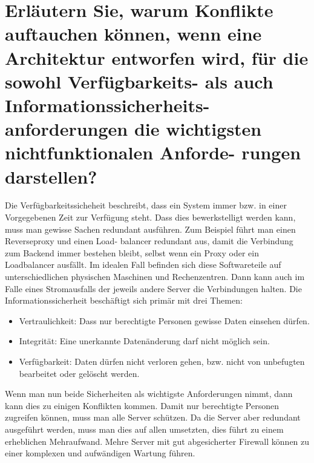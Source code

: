 \documentclass[12pt]{article}
\begin{document}
\section{Erläutern Sie, warum Konflikte auftauchen können, wenn eine Architektur entworfen wird, für die sowohl
Verfügbarkeits- als auch Informationssicherheits- anforderungen die wichtigsten nichtfunktionalen Anforde-
rungen darstellen?}
Die Verfügbarkeitssicheheit beschreibt, dass ein System immer bzw. in einer Vorgegebenen Zeit zur Verfügung steht. Dass dies bewerkstelligt werden kann, muss man gewisse Sachen redundant ausführen. Zum Beispiel führt man einen Reverseproxy und einen Load- balancer redundant aus, damit die Verbindung zum Backend immer bestehen bleibt, selbst wenn ein Proxy oder ein Loadbalancer ausfällt. Im idealen Fall befinden sich diese Softwareteile auf unterschiedlichen physischen Maschinen und Rechenzentren. Dann kann auch im Falle eines Stromausfalls der jeweils andere Server die Verbindungen halten. Die Informationssicherheit beschäftigt sich primär mit drei Themen:
\begin{itemize}
 \item Vertraulichkeit: Dass nur berechtigte Personen gewisse Daten einsehen dürfen.
 \item Integrität: Eine unerkannte Datenänderung darf nicht möglich sein.
 \item Verfügbarkeit: Daten dürfen nicht verloren gehen, bzw. nicht von unbefugten bearbeitet oder gelöscht werden.
\end{itemize}
Wenn man nun beide Sicherheiten als wichtigste Anforderungen nimmt, dann kann dies zu einigen Konflikten kommen. Damit nur berechtigte Personen zugreifen können, muss man alle Server schützen. Da die Server aber redundant ausgeführt werden, muss man dies auf allen umsetzten, dies führt zu einem erheblichen Mehraufwand. Mehre Server mit gut abgesicherter Firewall können zu einer komplexen und aufwändigen Wartung führen.
\cite{info}
\cite{verf}
\end{document}

